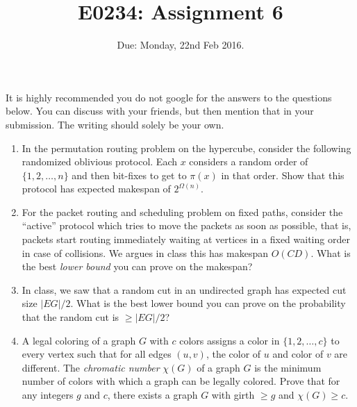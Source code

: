 \documentclass[11pt]{article}
\begin{document}
\def\Exp{\mathbf{Exp}}
\def\Var{\mathbf{Var}}
\title{E0234: Assignment 6}
\author{}
\date{Due: Monday, 22nd Feb 2016.}
\maketitle
It is highly recommended you do not google for the answers to the questions below. You can discuss with your friends, but then mention that in your submission.
The writing should solely be your own.

\begin{enumerate}
\item In the permutation routing problem on the hypercube, consider the following randomized oblivious protocol. Each $x$ considers a random order of $\{1,2,\ldots,n\}$ and then bit-fixes to get to $\pi(x)$ in that order. Show that this protocol has expected makespan of $2^{\Omega(n)}$.

\item
For the packet routing and scheduling problem on fixed paths, consider the ``active'' protocol which tries to move the packets as soon as possible, that is, packets start routing immediately 
waiting at vertices in a fixed waiting order in case of collisions. We argues in class this has makespan $O(CD)$. What is the best {\em lower bound} you can prove on the makespan?

\item 
In class, we saw that a random cut in an undirected graph has expected cut size $|EG|/2$. What is the best lower bound you can prove on the probability that the random cut is $\geq |EG|/2$?

\item 
A legal coloring of a graph $G$ with $c$ colors assigns a color in $\{1,2,\ldots,c\}$ to every vertex such that for all edges $(u,v)$, the color of $u$ and color of $v$ are different.
The {\em chromatic number} $\chi(G)$ of a graph $G$ is the minimum number of colors with which a graph can be legally colored.
Prove that for any integers $g$ and $c$, there exists a graph $G$ with girth $\geq g$ and $\chi(G) \geq c$.



\end{enumerate}
\end{document}
